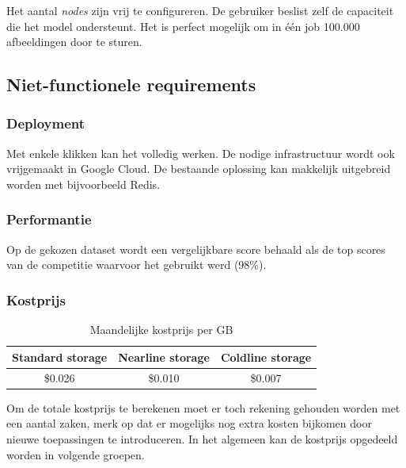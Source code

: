 Het aantal \textit{nodes} zijn vrij te configureren. De gebruiker beslist zelf de capaciteit die het model ondersteunt. Het is perfect mogelijk om in één job 100.000 afbeeldingen door te sturen.

\subsection{Niet-functionele requirements}
\label{subsec:googlautoml-nfr} 

\subsubsection{Deployment}
\label{sucsubsec:google-nfr-deployment}

Met enkele klikken kan het volledig werken. De nodige infrastructuur wordt ook vrijgemaakt in Google Cloud. De bestaande oplossing kan makkelijk uitgebreid worden met bijvoorbeeld Redis.

\subsubsection{Performantie}
\label{sucsubsec:google-nfr-performantie}

Op de gekozen dataset wordt een vergelijkbare score behaald als de top scores van de competitie waarvoor het gebruikt werd (98\%).

\subsubsection{Kostprijs}
\label{sucsubsec:google-nfr-price}

\begin{table}
    \centering
    \begin{tabular}{||c c c||} 
        \hline
        Standard storage & Nearline storage & Coldline storage \\ [0.5ex] 
        \hline\hline
        \$0.026 & \$0.010 & \$0.007  \\ 
        \hline
    \end{tabular}
    \caption{Maandelijke kostprijs per GB}
    \label{table:google-storage-price}
\end{table}

Om de totale kostprijs te berekenen moet er toch rekening gehouden worden met een aantal zaken, merk op dat er mogelijks nog extra kosten bijkomen door nieuwe toepassingen te introduceren. In het algemeen kan de kostprijs opgedeeld worden in volgende groepen.

